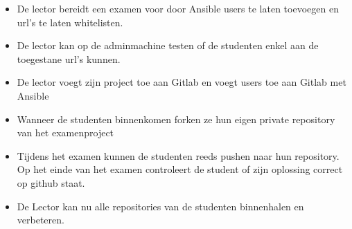\begin{itemize}
	\item De lector bereidt een examen voor door Ansible users te laten toevoegen en url's te laten whitelisten.
	\item De lector kan op de adminmachine testen of de studenten enkel aan de toegestane url's kunnen.
	\item De lector voegt zijn project toe aan Gitlab en voegt users toe aan Gitlab met Ansible
	\item Wanneer de studenten binnenkomen forken ze hun eigen private repository van het examenproject
	\item Tijdens het examen kunnen de studenten reeds pushen naar hun repository. Op het einde van het examen controleert de student of zijn oplossing correct op github staat.
	\item De Lector kan nu alle repositories van de studenten binnenhalen en verbeteren.
\end{itemize}




